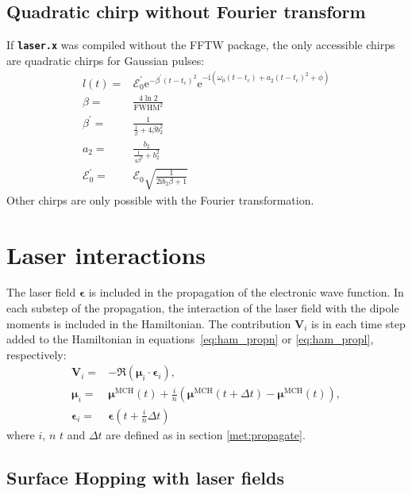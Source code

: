 \documentclass[a4paper,10pt,DIV=15,openany,twoside=false]{scrbook}
\newcommand{\ttt}[1]{\textbf{\texttt{#1}}}
\newcommand{\E}{\ensuremath{\mathrm{e}}}
\newcommand{\I}{\ensuremath{\mathrm{i}}}
\newcommand{\VEC}[1]{\ensuremath{\mathbf{#1}}}
\begin{document}
\subsection{Quadratic chirp without Fourier transform}

If \ttt{laser.x} was compiled without the FFTW package, the only accessible chirps are quadratic chirps for Gaussian pulses:
\begin{align}
  l(t)=&
  \mathcal{E}_0^\prime
  \E^{-\beta^\prime(t-t_c)^2}
  \E^{-\I\left(
    \omega_0(t-t_c)+a_2(t-t_c)^2+\phi
  \right)}\\
  \beta=&\frac{4\ln 2}{\mathrm{FWHM}^2}\\
  \beta^\prime=&\frac{1}{\frac{1}{\beta}+4\beta b_2^2}\\
  a_2=&\frac{b_2}{\frac{1}{4\beta^2}+b^2_2}\\
  \mathcal{E}_0^\prime=&\mathcal{E}_0\sqrt{\frac{1}{2\I b_2\beta+1}}
\end{align}
Other chirps are only possible with the Fourier transformation.



\section{Laser interactions}\label{met:laser}

The laser field $\boldsymbol{\epsilon}$ is included in the propagation of the electronic wave function. In each substep of the propagation, the interaction of the laser field with the dipole moments is included in the Hamiltonian. The contribution $\VEC{V}_i$ is in each time step added to the Hamiltonian in equations~\eqref{eq:ham_propn} or \eqref{eq:ham_propl}, respectively:
\begin{align}
  \VEC{V}_i=&
  -
  \Re\left(
    \boldsymbol{\mu}_i\cdot
    \boldsymbol{\epsilon}_i
  \right),\\
  \boldsymbol{\mu}_i=&
  \boldsymbol{\mu}^{\text{MCH}}(t) + \frac{i}{n}
  \left(
    \boldsymbol{\mu}^{\text{MCH}}(t+\Delta t)-\boldsymbol{\mu}^{\text{MCH}}(t)
  \right),\\
  \boldsymbol{\epsilon}_i=&\boldsymbol{\epsilon}\left(t+\frac{i}{n}\Delta t\right)
\end{align}
where $i$, $n$ $t$ and $\Delta t$ are defined as in section \ref{met:propagate}.

\subsection{Surface Hopping with laser fields}
\end{document}
